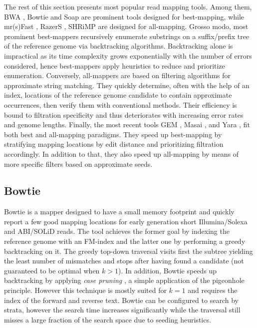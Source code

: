 The rest of this section presents most popular read mapping tools.
Among them, BWA \citep{Li2009,Li2010a}, Bowtie \citep{Langmead2009,Langmead2012} and Soap \citep{Li2009b} are prominent tools designed for best-mapping, while mr(s)Fast \citep{Alkan2009,Hach2010}, RazerS \citep{Weese2009,Weese2012}, SHRiMP \citep{Rumble2009,David2011} are designed for all-mapping.
Grosso modo, most prominent best-mappers recursively enumerate substrings on a suffix/prefix tree of the reference genome via backtracking algorithms.
Backtracking alone is impractical as its time complexity grows exponentially with the number of errors considered, hence best-mappers apply heuristics to reduce and prioritize enumeration.
Conversely, all-mappers are based on filtering algorithms for approximate string matching.
They quickly determine, often with the help of an index, locations of the reference genome candidate to contain approximate occurrences, then verify them with conventional methods.
Their efficiency is bound to filtration specificity and thus deteriorates with increasing error rates and genome lengths.
Finally, the most recent tools GEM \citep{MarcoSola2012}, Masai \citep{Siragusa2013}, and Yara \citep{Siragusa2014}, fit both best and all-mapping paradigms.
They speed up best-mapping by stratifying mapping locations by edit distance and prioritizing filtration accordingly.
In addition to that, they also speed up all-mapping by means of more specific filters based on approximate seeds.



\subsection{Bowtie}
\label{background:mappers:bowtie}

Bowtie \citep{Langmead2009} is a mapper designed to have a small memory footprint and quickly report a few good mapping locations for early generation short Illumina/Solexa and ABI/SOLiD reads.
The tool achieves the former goal by indexing the reference genome with an FM-index and the latter one by performing a greedy backtracking on it.
The greedy top-down traversal visits first the subtree yielding the least number of mismatches and stops after having found a candidate (not guaranteed to be optimal when $k>1$).
In addition, Bowtie speeds up backtracking by applying \emph{case pruning} \citep{Maekinen2010}, a simple application of the pigeonhole principle.
However this technique is mostly suited for $k=1$ and requires the index of the forward and reverse text.
Bowtie can be configured to search by strata, however the search time increases significantly while the traversal still misses a large fraction of the search space due to seeding heuristics.


